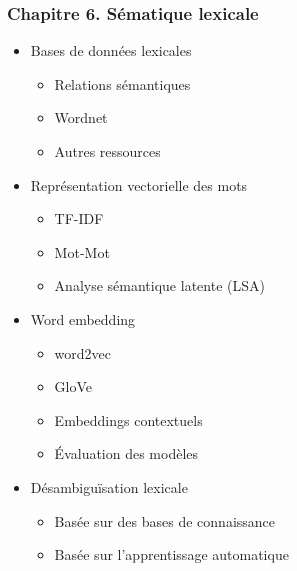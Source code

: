 \documentclass[11pt, a4paper]{article}
\begin{document}
\begin{tcolorbox}
\subsubsection*{Chapitre 6. Sématique lexicale}

\begin{multicols}{2}
\begin{itemize}
	
	\item Bases de données lexicales
	\begin{itemize}
		\item Relations sémantiques
		\item Wordnet
		\item Autres ressources
	\end{itemize}
	
	\item Représentation vectorielle des mots
	\begin{itemize}
		\item TF-IDF
		\item Mot-Mot
		\item Analyse sémantique latente (LSA)
	\end{itemize}

	\item Word embedding
	\begin{itemize}
		\item word2vec
		\item GloVe
		\item Embeddings contextuels
		\item Évaluation des modèles
	\end{itemize}

	\item Désambiguïsation lexicale
	\begin{itemize}
		\item Basée sur des bases de connaissance
		\item Basée sur l'apprentissage automatique
	\end{itemize}
	
\end{itemize}
\end{multicols}
\end{tcolorbox}
\end{document}
